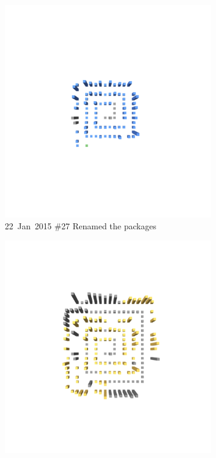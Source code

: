 \begin{figure}[ht]
\begin{subfigure}{0.32\textwidth}
        \includegraphics[width=\linewidth]{JetUML_V0S5.png}
        \caption{\mbox{22 Jan 2015}  \hfill  \linebreak  \#27 Renamed the packages} 
        \label{fig:JetUML_V0S5}
    \end{subfigure}
    \hspace*{\fill}
    \begin{subfigure}{0.32\textwidth}
        \includegraphics[width=\linewidth]{JetUML_V0S6.png}

\end{subfigure}
\end{figure}
